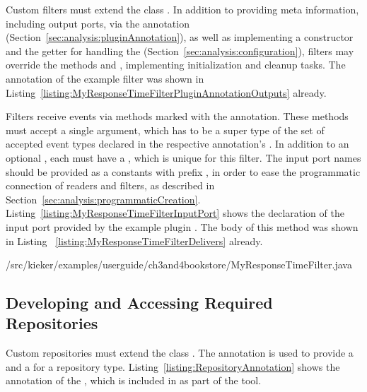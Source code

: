 Custom filters must extend the class . %
In addition to providing meta information, including output ports, via the %
 annotation %
(Section~\ref{sec:analysis:pluginAnnotation}), as well as implementing a constructor %
and the getter for handling the  (Section~\ref{sec:analysis:configuration}), %
filters may override the methods  and %
, implementing initialization and cleanup tasks. %
The  annotation of the example filter  %
was shown in Listing~\ref{listing:MyResponseTimeFilterPluginAnnotationOutputs} already.


Filters receive events via methods marked with the  %
annotation. These methods must accept a single argument, which has to be %
a super type of the set of accepted event types declared in the respective %
 annotation's . %
In addition to an optional , each  %
must have a , which is unique for this filter. The input port names %
should be provided as a  constants %
with prefix , in order to ease the programmatic %
connection of readers and filters, as described in %
Section~\ref{sec:analysis:programmaticCreation}. %
Listing~\ref{listing:MyResponseTimeFilterInputPort} shows the declaration %
of the input port provided by the example plugin . %
The body of this method was shown in Listing~%
\ref{listing:MyResponseTimeFilterDelivers} already.


\setJavaCodeListing
%
{\customComponentsBookstoreApplicationDir/src/kieker/examples/userguide/ch3and4bookstore/MyResponseTimeFilter.java}

\subsection{Developing and Accessing Required Repositories}\label{sec:analysis:repositories}

Custom repositories must extend the class . %
The  annotation is used to provide a  %
and a  for a repository type. %
Listing~\ref{listing:RepositoryAnnotation} shows the  annotation %
of the , which is included in \Kieker{} as part of the %
\KiekerTraceAnalysis{} tool. %


